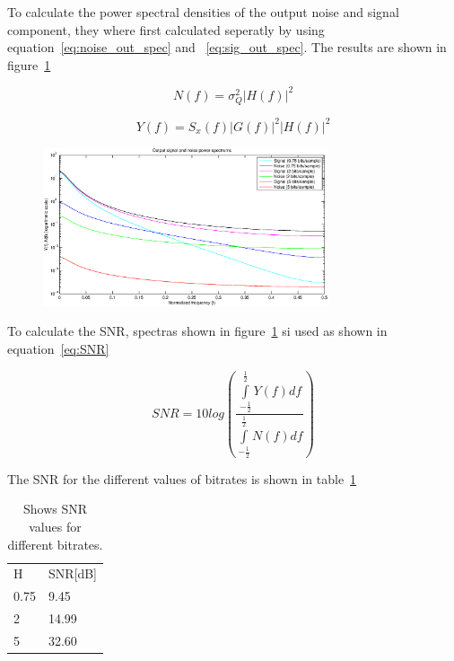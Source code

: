 	To calculate the power spectral densities of the output noise and signal component, they where first calculated seperatly by using equation~\ref{eq:noise_out_spec} and ~\ref{eq:sig_out_spec}. The results are shown in figure~\ref{fig:sig_noise_freq_out}
	
	\begin{equation}
		N(f)=\sigma _Q^2|H(f)|^2
		\label{eq:noise_out_spec}
	\end{equation}
	
	\begin{equation}
		Y(f)=S_x(f)|G(f)|^2|H(f)|^2
		\label{eq:sig_out_spec}
	\end{equation}
	
	
	\begin{figure}[H]
	  \centering
	  \includegraphics[width=0.75\textwidth]{img/Oppgave2a_sig_noise_freq_out}
	  \label{fig:sig_noise_freq_out}
	\end{figure}
	
	To calculate the SNR, spectras shown in  figure~\ref{fig:sig_noise_freq_out} si used as shown in equation~\ref{eq:SNR}
	
	\begin{equation}
		SNR=10log\left(\frac{\int\limits_{-\frac{1}{2}}^{\frac{1}{2}}Y(f)df}{\int\limits_{-\frac{1}{2}}^{\frac{1}{2}}N(f)df}\right)
		\label{eq:SNR}
	\end{equation}
	
	The SNR for the different values of bitrates is shown in table~\ref{tab:SNR_results}
	
	\begin{table}[H]
		\centering
		\begin{tabular}{l l}
			H & SNR[dB] \\
			0.75 & 9.45 \\
			2 & 14.99 \\
			5 & 32.60 \\
		\end{tabular}
		\label{tab:SNR_results}
		\caption{Shows SNR values for different bitrates.}
	\end{table}

